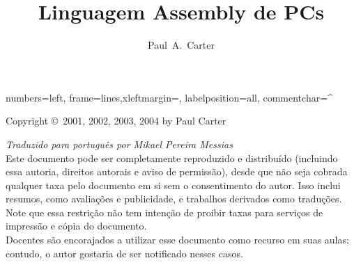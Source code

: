 \documentclass[11pt]{book}
\author{Paul~A.~Carter}
\title{Linguagem Assembly de PCs}
\newif\ifmypdf
\begin{document}
\maketitle
\newlength{\AsmMargin}
\setlength{\AsmMargin}{-1cm}
{numbers=left, frame=lines,xleftmargin=\AsmMargin, labelposition=all, commentchar=^ }

\newcommand{\MarginNote}[1]{\marginpar{\sloppy \em \small #1}}
\thispagestyle{empty}
\vspace*{\fill}
\noindent Copyright \copyright\  2001, 2002, 2003, 2004 by Paul Carter

\noindent \emph{Traduzido para portugu\^es por Mikael Pereira Messias}\\

\noindent Este documento pode ser completamente reproduzido e distribu\'ido
(incluindo essa autoria, direitos autorais e aviso de permiss\~ao), desde que
n\~ao seja cobrada qualquer taxa pelo documento em si sem o consentimento do
autor. Isso inclui resumos, como avalia\c{c}\~oes e publicidade, e trabalhos derivados
como tradu\c{c}\~oes. \\

\noindent \noindent Note que essa restri\c{c}\~ao n\~ao tem inten\c{c}\~ao de proibir taxas para 
servi\c{c}os de impress\~ao e c\'opia do documento.\\

\noindent Docentes s\~ao encorajados a utilizar esse documento como recurso em suas
aulas; contudo, o autor gostaria de ser notificado nesses casos.\\


\vfill
\frontmatter


\mainmatter







% 
\begin{appendix}

\end{appendix}
\clearpage
\ifmypdf
\phantomsection %
\fi
{}
\printindex
\end{document}
